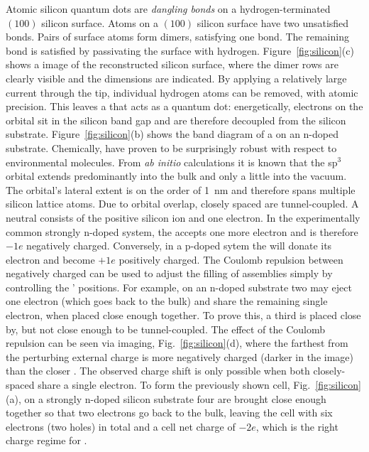 Atomic silicon quantum dots are \emph{dangling bonds} on a hydrogen-terminated
$(100)$ silicon surface. Atoms on a $(100)$ silicon surface have two unsatisfied
bonds. Pairs of surface atoms form dimers, satisfying one bond. The remaining
bond is satisfied by passivating the surface with hydrogen.
Figure~\ref{fig:silicon}(c) shows a  image of the reconstructed
silicon surface, where the dimer rows are clearly visible and the dimensions are
indicated. By applying a relatively large current through the  tip,
individual hydrogen atoms can be removed, with atomic precision. This leaves a
\emph{} that acts as a quantum dot: energetically, electrons on the
 orbital sit in the silicon band gap and are therefore decoupled from
the silicon substrate. Figure~\ref{fig:silicon}(b) shows the band diagram of a
 on an n-doped substrate. Chemically,  have proven to be
surprisingly robust with respect to environmental molecules. From \emph{ab
initio} calculations it is known that the sp$^3$  orbital extends
predominantly into the bulk and only a little into the vacuum. The orbital's
lateral extent is on the order of 1~nm and therefore spans multiple silicon
lattice atoms. Due to orbital overlap, closely spaced  are
tunnel-coupled. A neutral  consists of the positive silicon ion and one
electron. In the experimentally common strongly n-doped system, the 
accepts one more electron and is therefore $-1e$ negatively charged. Conversely,
in a p-doped sytem the  will donate its electron and become $+1e$
positively charged. The Coulomb repulsion between negatively charged 
can be used to adjust the filling of  assemblies simply by controlling
the ' positions. For example, on an n-doped substrate two 
may eject one electron (which goes back to the bulk) and share the remaining
single electron, when placed close enough together. To prove this, a third
 is placed close by, but not close enough to be tunnel-coupled. The
effect of the Coulomb repulsion can be seen via  imaging,
Fig.~\ref{fig:silicon}(d), where the  farthest from the perturbing
external charge is more negatively charged (darker in the  image) than
the closer . The observed charge shift is only possible when both
closely-spaced  share a single electron. To form the previously shown
 cell, Fig.~\ref{fig:silicon}(a), on a strongly n-doped silicon
substrate four  are brought close enough together so that two
electrons go back to the bulk, leaving the cell with six electrons (two holes)
in total and a cell net charge of $-2e$, which is the right charge regime for
.

